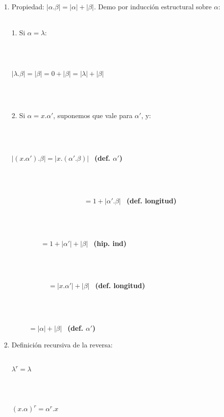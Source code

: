 \documentclass{article}
\begin{document}
{{\begin{enumerate}
    \item {Propiedad: $|\alpha . \beta| = |\alpha|+|\beta|$. Demo por inducción estructural sobre $\alpha$:}
    \\
    \\
    \centerline{1. Si $\alpha = \lambda$:}
    \\
    \\
    \centerline{$|\lambda.\beta| = |\beta| = 0 + |\beta| = |\lambda| + |\beta|$}
    \\
    \\
    \centerline{2. Si $\alpha = x.\alpha'$, suponemos que vale para $\alpha'$, y:}
    \\
    \\
    \centerline{$|(x.\alpha').\beta| = |x.(\alpha'.\beta)|$ \ \textbf{(def. $\alpha'$)}}
    \\
    \\
    \centerline{ \ \ \ \ \ \ \ \ \ \ \ \ \ \ \ \ \ \ \ \ \ $= 1 +|\alpha'.\beta|$  \ \textbf{(def. longitud)}}
    \\
    \\
    \centerline{$ \ \ \ \ \ \ \ \ \ \ \ \ \ \ \ \ \ \ \ = 1 +|\alpha'| + |\beta|$ \ \textbf{(hip. ind)}}
    \\
    \\
    \centerline{$ \ \ \ \ \ \ \ \ \ \ \ \ \ \ \ \ \ \ \ \ \ \ \ \ = |x.\alpha'| + |\beta|$ \ \textbf{(def. longitud)}}
    \\
    \\
    \centerline{$ \ \ \ \ \ \ \ \ \ \ \ = |\alpha| + |\beta|$ \ \textbf{(def. $\alpha'$)}}    

    \item {Definición recursiva de la reversa:}
    \\
    \\
    \centerline{$\lambda^r = \lambda$}
    \\
    \\
    \centerline{$(x.\alpha)^r = \alpha^r.x$}
\end{enumerate}


}}
\end{document}
